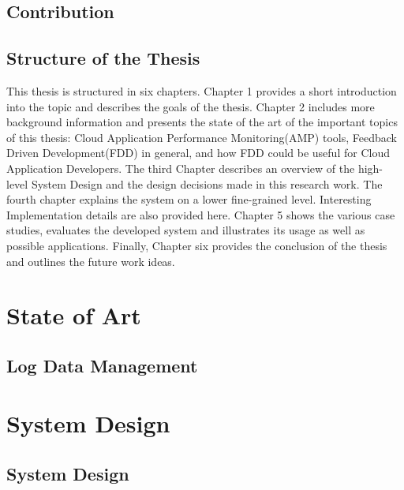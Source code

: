 \documentclass[article,type=msc,colorback,accentcolor=tud7b]{tudthesis}
\begin{document}
	
	\subsection{Contribution}
	
	\subsection{Structure of the Thesis}

	\par This thesis is structured in six chapters. Chapter 1 provides a short introduction into the topic and describes the goals of the thesis. Chapter 2 includes more background information and presents the state of the art of the important topics of this thesis: Cloud Application Performance Monitoring(AMP) tools, Feedback Driven Development(FDD) in general, and how FDD could be useful for Cloud Application Developers. The third Chapter describes an overview of the high-level System Design and the design decisions made in this research work. The fourth chapter explains the system on a lower fine-grained level. Interesting Implementation details are also provided here. Chapter 5 shows the various case studies, evaluates the developed system and illustrates its usage as well as possible applications. Finally, Chapter six provides the conclusion of the thesis and outlines the future work ideas.


	\cleardoublepage

 \section{State of Art}

    
	\subsection{Log Data Management}	
	
	
 \cleardoublepage
 \section{System Design}	
 \subsection{System Design}
\end{document}
